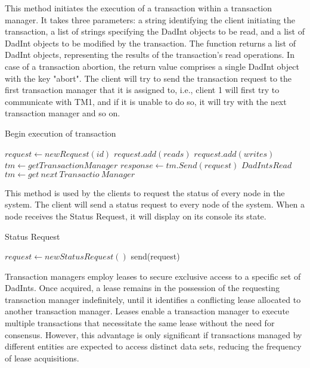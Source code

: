 \documentclass[times, 10pt,twocolumn]{article}
\begin{document}
This method initiates the execution of a transaction within a transaction manager. 
It takes three parameters: a string identifying the client initiating the transaction, 
a list of strings specifying the DadInt objects to be read, and a list of DadInt 
objects to be modified by the transaction. The function returns a list of DadInt 
objects, representing the results of the transaction's read operations. 
In case of a transaction abortion, the return value comprises a single DadInt 
object with the key "abort". The client will try to send the transaction request to 
the first transaction manager that it is assigned to, i.e., client 1 will first 
try to communicate with TM1, and if it is unable to do so, it will try with the next 
transaction manager and so on.

\begin{algorithm}
    \caption{Begin execution of transaction}
    \begin{algorithmic}[1]
            \State $request \gets newRequest(id)$
            \State $request.add(reads)$
            \State $request.add(writes)$
            \State $tm \gets getTransactionManager$
                \State $response \gets tm.Send(request)$
                    \Return $DadInts Read$
                \Else{}
                    \State $tm \gets get\ next\ Transactio\ Manager$
                \EndIf
            \EndWhile
        \EndFunction
    \end{algorithmic}
\end{algorithm}

This method is used by the clients to request the status of every 
node in the system. The client will send a status request to every 
node of the system. When a node receives the Status Request, 
it will display on its console its state.

\begin{algorithm}
    \caption{Status Request}
    \begin{algorithmic}[1]
            \State $request \gets newStatusRequest()$
                \State send(request)
            \EndFor
        \EndFunction
    \end{algorithmic}
\end{algorithm}

Transaction managers employ leases to secure exclusive access 
to a specific set of DadInts. Once acquired, a lease remains in 
the possession of the requesting transaction manager indefinitely, 
until it identifies a conflicting lease allocated to another 
transaction manager. Leases enable a transaction manager to 
execute multiple transactions that necessitate the same lease 
without the need for consensus. However, this advantage is only 
significant if transactions managed by different entities are 
expected to access distinct data sets, reducing the frequency of 
lease acquisitions.
\end{document}
